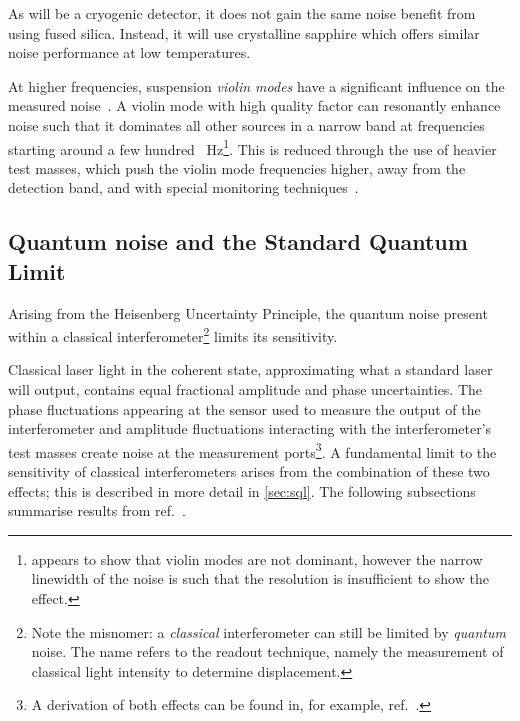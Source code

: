As \KAGRA{} will be a cryogenic detector, it does not gain the same noise benefit from using fused silica. Instead, it will use crystalline sapphire which offers similar noise performance at low temperatures.

At higher frequencies, suspension \emph{violin modes} have a significant influence on the measured noise~\cite{Robertson2002}. A violin mode with high quality factor can resonantly enhance noise such that it dominates all other sources in a narrow band at frequencies starting around a few hundred \SI{}{\hertz}\footnote{ appears to show that violin modes are not dominant, however the narrow linewidth of the noise is such that the resolution is insufficient to show the effect.}. This is reduced through the use of heavier test masses, which push the violin mode frequencies higher, away from the detection band, and with special monitoring techniques~\cite{Sorazu2010}.

\subsection{\label{sec:quantum-noise}Quantum noise and the Standard Quantum Limit}
Arising from the Heisenberg Uncertainty Principle, the quantum noise present within a classical interferometer\footnote{Note the misnomer: a \emph{classical} interferometer can still be limited by \emph{quantum} noise. The name refers to the readout technique, namely the measurement of classical light intensity to determine displacement.} limits its sensitivity.

Classical laser light in the coherent state, approximating what a standard laser will output, contains equal fractional amplitude and phase uncertainties. The phase fluctuations appearing at the sensor used to measure the output of the interferometer and amplitude fluctuations interacting with the interferometer's test masses create noise at the measurement ports\footnote{A derivation of both effects can be found in, for example, ref.~\cite{Danilishin2012}.}. A fundamental limit to the sensitivity of classical interferometers arises from the combination of these two effects; this is described in more detail in \cref{sec:sql}. The following subsections summarise results from ref.~\cite{Danilishin2012}.

